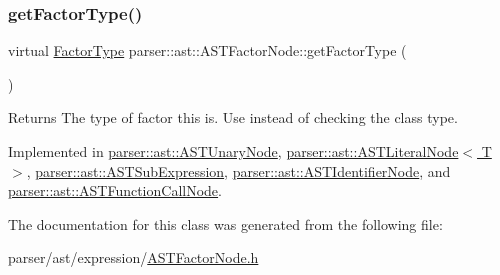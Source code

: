 \subsubsection{\texorpdfstring{get\+Factor\+Type()}{getFactorType()}}
{\footnotesize\ttfamily virtual \hyperlink{ASTFactorNode_8h_afbe2fcc03ef15b74a0c1ed1cda7ab0e8}{Factor\+Type} parser\+::ast\+::\+A\+S\+T\+Factor\+Node\+::get\+Factor\+Type (\begin{DoxyParamCaption}{ }\end{DoxyParamCaption})\hspace{0.3cm}{\ttfamily [pure virtual]}}

\begin{DoxyReturn}{Returns}
The type of factor this is. Use instead of checking the class type. 
\end{DoxyReturn}


Implemented in \hyperlink{classparser_1_1ast_1_1ASTUnaryNode_a1056ebc5c34b6f3b0a5485f4cd5ba3c0}{parser\+::ast\+::\+A\+S\+T\+Unary\+Node}, \hyperlink{classparser_1_1ast_1_1ASTLiteralNode_a08efdbff5f7b0a0b7623ad964a6e4a9f}{parser\+::ast\+::\+A\+S\+T\+Literal\+Node$<$ T $>$}, \hyperlink{classparser_1_1ast_1_1ASTSubExpression_a0a7ade91b1cce64eacfb9b5f6167db3f}{parser\+::ast\+::\+A\+S\+T\+Sub\+Expression}, \hyperlink{classparser_1_1ast_1_1ASTIdentifierNode_a7b759817af29784741596a4387b6547f}{parser\+::ast\+::\+A\+S\+T\+Identifier\+Node}, and \hyperlink{classparser_1_1ast_1_1ASTFunctionCallNode_a1c40c8e98284fd4389b34da161e8b39a}{parser\+::ast\+::\+A\+S\+T\+Function\+Call\+Node}.



The documentation for this class was generated from the following file\+:\begin{DoxyCompactItemize}
\item 
parser/ast/expression/\hyperlink{ASTFactorNode_8h}{A\+S\+T\+Factor\+Node.\+h}\end{DoxyCompactItemize}
